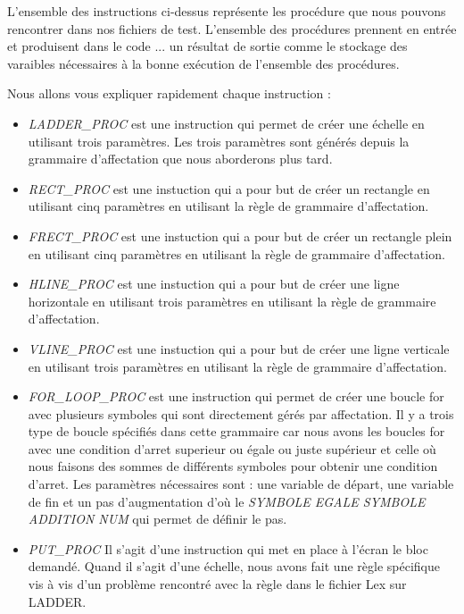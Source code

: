 L'ensemble des instructions ci-dessus représente les procédure que nous pouvons rencontrer dans nos fichiers de test. L'ensemble des procédures prennent en entrée et produisent dans le code {...} un résultat de sortie comme le stockage des varaibles nécessaires à la bonne exécution de l'ensemble des procédures.


Nous allons vous expliquer rapidement chaque instruction : 

\begin{itemize}

\item \textit{LADDER\_PROC} est une instruction qui permet de créer une échelle en utilisant trois paramètres. Les trois paramètres sont générés depuis la grammaire d'affectation que nous aborderons plus tard.

\item \textit{RECT\_PROC} est une instuction qui a pour but de créer un rectangle en utilisant cinq paramètres en utilisant la règle de grammaire d'affectation.

\item \textit{FRECT\_PROC} est une instuction qui a pour but de créer un rectangle plein en utilisant cinq paramètres en utilisant la règle de grammaire d'affectation.

\item \textit{HLINE\_PROC} est une instuction qui a pour but de créer une ligne horizontale en utilisant trois paramètres en utilisant la règle de grammaire d'affectation.

\item \textit{VLINE\_PROC} est une instuction qui a pour but de créer une ligne verticale en utilisant trois paramètres en utilisant la règle de grammaire d'affectation.

\item \textit{FOR\_LOOP\_PROC} est une instruction qui permet de créer une boucle for avec plusieurs symboles qui sont directement gérés par affectation. Il y a trois type de boucle spécifiés dans cette grammaire car nous avons les boucles for avec une condition d'arret superieur ou égale ou juste supérieur et celle où nous faisons des sommes de différents symboles pour obtenir une condition d'arret. Les paramètres nécessaires sont : une variable de départ, une variable de fin et un pas d'augmentation d'où le \textit{ SYMBOLE EGALE SYMBOLE ADDITION NUM} qui permet de définir le pas.

\item \textit{PUT\_PROC} Il s'agit d'une instruction qui met en place à l'écran le bloc demandé. Quand il s'agit d'une échelle, nous avons fait une règle spécifique vis à vis d'un problème rencontré avec la règle dans le fichier Lex sur LADDER.

\end{itemize}

